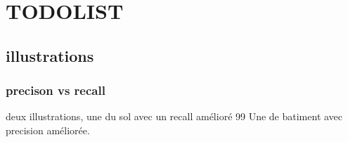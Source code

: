 
\newpage

\section{TODOLIST}

	\subsection{illustrations} 
	 
		 \subsubsection{precison vs recall}
			 deux illustrations, une du sol avec un recall amélioré 99%
			 Une de batiment avec precision améliorée. 
	 

\newpage
